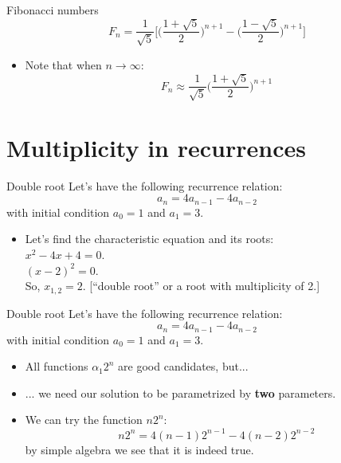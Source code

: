 \documentclass{beamer}
\begin{document}
\begin{frame}{Fibonacci numbers}
    $$ F_n = \frac{1}{\sqrt{5}} \Bigg[ \Bigg(\frac{1 + \sqrt{5}}{2} \Bigg)^{n+1} - \Bigg(\frac{1 - \sqrt{5}}{2} \Bigg)^{n+1} \Bigg] $$
    \begin{itemize}
        \item Note that when $n \rightarrow \infty$:
        $$ F_n \approx \frac{1}{\sqrt{5}} \Bigg(\frac{1 + \sqrt{5}}{2} \Bigg)^{n+1} $$
    \end{itemize}
    \begin{figure}
    \centering
    \def\svgwidth{0.45\columnwidth}
    \href{https://www.youtube.com/watch?v=aB_KstBiou4}{}
    \end{figure}
\end{frame}

\section*{Multiplicity in recurrences}

\begin{frame}{Double root}
    Let's have the following recurrence relation:
        $$ a_n = 4 a_{n-1} - 4 a_{n-2} $$
    with initial condition $a_0 = 1$ and $a_1 = 3$.
    \begin{itemize}
     \item Let's find the characteristic equation and its roots: \\
     $ x^2 - 4x + 4 = 0 $. \\
     $ (x - 2)^2 = 0 $. \\
     So, $x_{1,2} = 2$.  \hspace{1cm} {\scriptsize [``double root'' or a root with multiplicity of 2.]}
    \end{itemize}
\end{frame}

\begin{frame}{Double root}
    Let's have the following recurrence relation:
        $$ a_n = 4 a_{n-1} - 4 a_{n-2} $$
    with initial condition $a_0 = 1$ and $a_1 = 3$.
    \begin{itemize}
     \item All functions $\alpha_1 2^n$ are good candidates, but...
     \item ... we need our solution to be parametrized by \textbf{two} parameters.
     \item We can try the function $n 2^n$:
     $$ n 2^n = 4(n -1) 2^{n-1} - 4 (n - 2) 2^{n-2} $$
     by simple algebra we see that it is indeed true.
    \end{itemize}
\end{frame}
\end{document}

